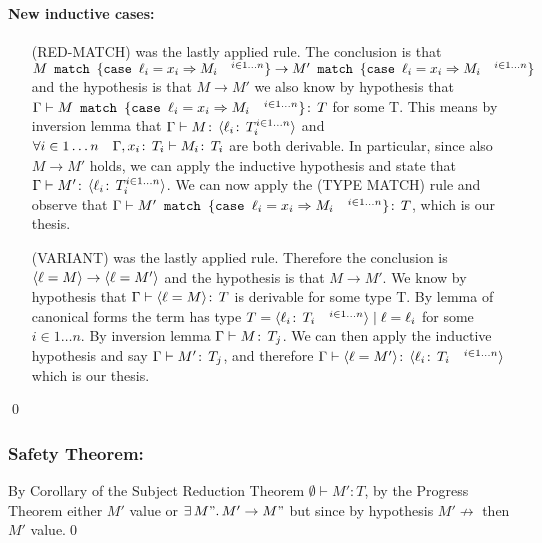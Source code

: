 \paragraph*{New inductive cases:\\}
\begin{itemize}
\item[(RED-MATCH)] was the lastly applied rule. The conclusion is that
  \(M\texttt{ match }\{\texttt{case }\ell_i = x_i \Rightarrow M_i \quad ^{i\in 1\dots n}\} \to
  M'\texttt{ match }\{\texttt{case }\ell_i = x_i \Rightarrow M_i \quad ^{i\in 1\dots n}\}\) and the
  hypothesis is that \(M\to M'\) we also know by hypothesis that
  \(\Gamma \vdash M\texttt{ match }\{\texttt{case }\ell_i = x_i \Rightarrow M_i \quad ^{i\in
      1\dots n}\} \!:\,T\) for some T. This means by inversion lemma
  that \(\Gamma \vdash M \!:\,\langle \ell_i \!:\,T_i^{i\in 1\dots
        n} \rangle\) and \(\forall i \in 1 \dots n \quad \Gamma,
  x_i\!:\,T_i \vdash M_i \!:\,T_i\) are both derivable. In
  particular, since also \(M \to M'\) holds, we can apply the
  inductive hypothesis and state that \(\Gamma \vdash M'
  \!:\,\langle \ell_i \!:\,T_i^{i\in 1\dots n} \rangle\). We can now apply
  the (TYPE MATCH) rule and observe that \(\Gamma \vdash
  M'\texttt{ match }\{\texttt{case }\ell_i = x_i \Rightarrow M_i \quad ^{i\in 1\dots n}\}
  \!:\,T\), which is our thesis.
\item[(VARIANT)] was the lastly applied rule. Therefore the conclusion
  is \(\langle \ell = M \rangle \to \langle \ell = M' \rangle\) and the hypothesis is that
  \(M\to M'\). We know by hypothesis that \(\Gamma \vdash \langle \ell =
    M \rangle \!:\,T\) is derivable for some type T. By lemma of canonical
  forms the term has type \(T = \langle \ell_i \!:\,T_i \quad^{i\in
      1\dots n} \rangle \mid \ell = \ell_i\) for some \(i\in 1\dots n\). By
  inversion lemma \(\Gamma \vdash M \!:\,T_j\). We can then apply
  the inductive hypothesis and say \(\Gamma \vdash M' \!:\,T_j\),
  and therefore \(\Gamma \vdash \langle \ell = M' \rangle\!:\,\langle \ell_i
      \!:\,T_i \quad^{i\in 1\dots n} \rangle\) which is our thesis.
\end{itemize} \qed

\subsubsection*{Safety Theorem:}

By Corollary of the Subject Reduction Theorem \(\emptyset \vdash M':
T\), by the Progress Theorem either \(M'\) value or \(\exists\, M".\,
M' \to M"\) but since by hypothesis \(M' \not\to\) then \(M'\)
value.\qed
